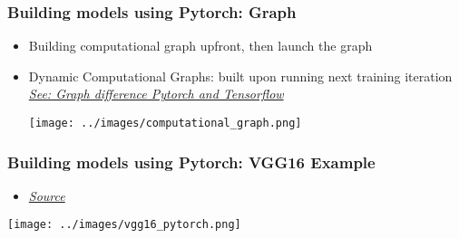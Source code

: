 \begin{frame}[fragile]
   \frametitle{Building models using Pytorch: Graph}
   \begin{itemize}
      \item Building computational graph upfront, then launch the graph
      \item Dynamic Computational Graphs: built upon running next training iteration\\
      \textit{\href{https://cs230.stanford.edu/section/5/}{See: Graph difference Pytorch and Tensorflow}}
      \begin{center}
         \texttt{[image: ../images/computational\_graph.png]}
      \end{center}
   \end{itemize}
\end{frame}


\begin{frame}[fragile]
   \frametitle{Building models using Pytorch: VGG16 Example}
   \begin{itemize}
      \item \textit{\href{https://github.com/pytorch/vision/blob/main/torchvision/models/vgg.py}{Source}}
   \end{itemize}
   \begin{center}
      \texttt{[image: ../images/vgg16\_pytorch.png]}
   \end{center}
\end{frame}

